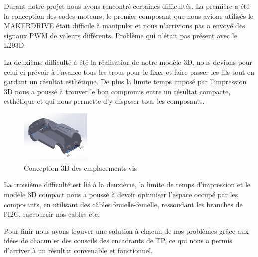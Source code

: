 Durant notre projet nous avons rencontré certaines difficultés. La première a été la conception des codes moteurs, le premier composant que nous avions utilisés le MAKERDRIVE était difficile à manipuler et nous n'arrivions pas a envoyé des signaux PWM de valeurs différents. Problème qui n'était pas présent avec le L293D.

La deuxième difficulté a été la réalisation de notre modèle 3D, nous devions pour celui-ci prévoir à l'avance tous les trous pour le fixer et faire passer les fils tout en gardant un résultat esthétique. De plus la limite temps imposé par l'impression 3D nous a poussé à trouver le bon compromis entre un résultat compacte, esthétique et qui nous permette d'y disposer tous les composants.

\begin{figure}[h]
    \centering
    \includegraphics[width=0.3\textwidth]{images/solidworks/solidworks2.png}
    \caption{Conception 3D des emplacements vis}
    \label{fig:Conception 3D emplacements vis}
\end{figure}

La troisième difficulté est lié à la deuxième, la limite de temps d'impression et le modèle 3D compact nous a poussé à devoir optimiser l'espace occupé par les composants, en utilisant des câbles femelle-femelle, ressoudant les branches de l'I2C, raccourcir nos cables etc.

Pour finir nous avons trouver une solution à chacun de nos problèmes grâce aux idées de chacun et des conseils des encadrants de TP, ce qui nous a permis d'arriver à un résultat convenable et fonctionnel.

\newpage